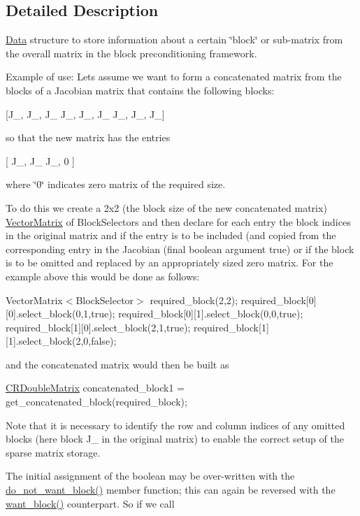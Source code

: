 \subsection{Detailed Description}
\hyperlink{classoomph_1_1Data}{Data} structure to store information about a certain \char`\"{}block\char`\"{} or sub-\/matrix from the overall matrix in the block preconditioning framework. 

Example of use\+: Let\textquotesingle{}s assume we want to form a concatenated matrix from the blocks of a Jacobian matrix that contains the following blocks\+:

\mbox{[}J\+\_, J\+\_, J\+\_ J\+\_, J\+\_, J\+\_ J\+\_, J\+\_, J\+\_\mbox{]}

so that the new matrix has the entries

\mbox{[} J\+\_, J\+\_ J\+\_, 0 \mbox{]}

where \char`\"{}0\char`\"{} indicates zero matrix of the required size.

To do this we create a 2x2 (the block size of the new concatenated matrix) \hyperlink{classoomph_1_1VectorMatrix}{Vector\+Matrix} of Block\+Selectors and then declare for each entry the block indices in the original matrix and if the entry is to be included (and copied from the corresponding entry in the Jacobian (final boolean argument true) or if the block is to be omitted and replaced by an appropriately sized zero matrix. For the example above this would be done as follows\+:

Vector\+Matrix$<$\+Block\+Selector$>$ required\+\_\+block(2,2); required\+\_\+block\mbox{[}0\mbox{]}\mbox{[}0\mbox{]}.select\+\_\+block(0,1,true); required\+\_\+block\mbox{[}0\mbox{]}\mbox{[}1\mbox{]}.select\+\_\+block(0,0,true); required\+\_\+block\mbox{[}1\mbox{]}\mbox{[}0\mbox{]}.select\+\_\+block(2,1,true); required\+\_\+block\mbox{[}1\mbox{]}\mbox{[}1\mbox{]}.select\+\_\+block(2,0,false);

and the concatenated matrix would then be built as

\hyperlink{classoomph_1_1CRDoubleMatrix}{C\+R\+Double\+Matrix} concatenated\+\_\+block1 = get\+\_\+concatenated\+\_\+block(required\+\_\+block);

Note that it is necessary to identify the row and column indices of any omitted blocks (here block J\+\_ in the original matrix) to enable the correct setup of the sparse matrix storage.

The initial assignment of the boolean may be over-\/written with the \hyperlink{classoomph_1_1BlockSelector_a2548e42fd02e258d46d0a4f74919f11a}{do\+\_\+not\+\_\+want\+\_\+block()} member function; this can again be reversed with the \hyperlink{classoomph_1_1BlockSelector_a2ac783d94aa3339ce43fc40e269ea628}{want\+\_\+block()} counterpart. So if we call

